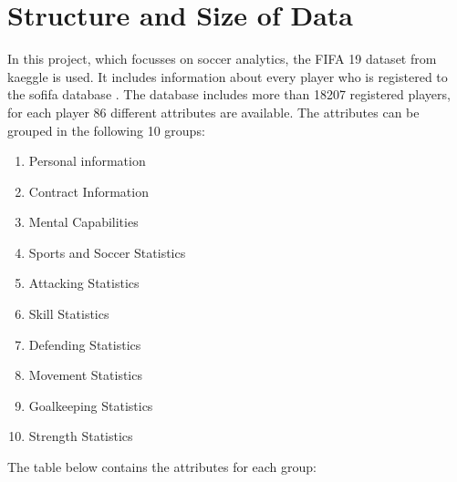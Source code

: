 \section{Structure and Size of Data}
In this project, which focusses on soccer analytics, the FIFA 19 dataset from kaeggle is used. It includes information about every player who is registered to the sofifa database \cite{ref_sofifa}. 
The database includes more than 18207 registered players, for each player 86 different attributes are available. The attributes can be grouped in the following 10 groups: 
\begin{multicols}{2}
	\begin{enumerate}
	\item Personal information
	\item Contract Information
	\item Mental Capabilities
	\item Sports and Soccer Statistics
	\item Attacking Statistics  
	\item Skill Statistics
	\item Defending Statistics
	\item Movement Statistics
	\item Goalkeeping Statistics
\item Strength Statistics
\end{enumerate}
\end{multicols}

The table below contains the attributes for each group:

